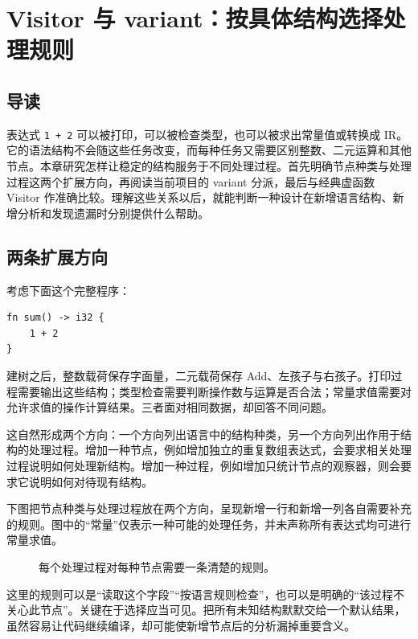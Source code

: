 \chapter{Visitor 与 variant：按具体结构选择处理规则}
\label{chap:front-visitor}

\section*{导读}
表达式 \texttt{1 + 2} 可以被打印，可以被检查类型，也可以被求出常量值或转换成 IR。它的语法结构不会随这些任务改变，而每种任务又需要区别整数、二元运算和其他节点。本章研究怎样让稳定的结构服务于不同处理过程。首先明确节点种类与处理过程这两个扩展方向，再阅读当前项目的 variant 分派，最后与经典虚函数 Visitor 作准确比较。理解这些关系以后，就能判断一种设计在新增语言结构、新增分析和发现遗漏时分别提供什么帮助。

\section{两条扩展方向}
考虑下面这个完整程序：
\begin{lstlisting}[language=Rustless]
fn sum() -> i32 {
    1 + 2
}
\end{lstlisting}
建树之后，整数载荷保存字面量，二元载荷保存 Add、左孩子与右孩子。打印过程需要输出这些结构；类型检查需要判断操作数与运算是否合法；常量求值需要对允许求值的操作计算结果。三者面对相同数据，却回答不同问题。

这自然形成两个方向：一个方向列出语言中的结构种类，另一个方向列出作用于结构的处理过程。增加一种节点，例如增加独立的重复数组表达式，会要求相关处理过程说明如何处理新结构。增加一种过程，例如增加只统计节点的观察器，则会要求它说明如何对待现有结构。

下图把节点种类与处理过程放在两个方向，呈现新增一行和新增一列各自需要补充的规则。图中的“常量”仅表示一种可能的处理任务，并未声称所有表达式均可进行常量求值。
\begin{figure}[htbp]
\centering
{}
\caption{每个处理过程对每种节点需要一条清楚的规则。}
\end{figure}
这里的规则可以是“读取这个字段”“按语言规则检查”，也可以是明确的“该过程不关心此节点”。关键在于选择应当可见。把所有未知结构默默交给一个默认结果，虽然容易让代码继续编译，却可能使新增节点后的分析漏掉重要含义。

